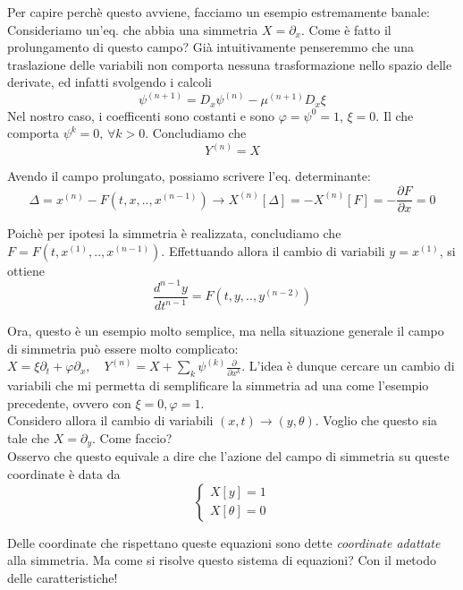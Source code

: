 \documentclass{report}
\begin{document}
Per capire perchè questo avviene, facciamo un esempio estremamente banale: Consideriamo un'eq. che abbia una simmetria $X = \partial_x$. Come è fatto il prolungamento di questo campo? Già intuitivamente penseremmo che una traslazione delle variabili non comporta nessuna trasformazione nello spazio delle derivate, ed infatti svolgendo i calcoli
\begin{equation}
    \psi^{(n+1)} = D_x\psi^{(n)} - \mu^{(n+1)}D_x\xi
\end{equation}
Nel nostro caso, i coefficenti sono costanti e sono $\varphi = \psi^{0} = 1$, $\xi =0$. Il che comporta $\psi^{k} = 0 , \, \forall k>0$. Concludiamo che 
\begin{equation}
    Y^{(n)} = X
\end{equation}

Avendo il campo prolungato, possiamo scrivere l'eq. determinante: 
\begin{equation}
    \Delta = x^{(n)} -F(t, x, .., x^{(n-1)}) \rightarrow X^{(n)}[\Delta] = -X^{(n)}[F] = -\frac{\partial F}{\partial x} = 0  
\end{equation}

Poichè per ipotesi la simmetria è realizzata, concludiamo che $F = F(t, x^{(1) }, .., x^{(n-1)})$. Effettuando allora il cambio di variabili $y = x^{(1)}$, si ottiene 
\begin{equation}
    \frac{d^{n-1} y}{dt^{n-1}} = F(t, y, .., y^{(n-2)})
\end{equation}

Ora, questo è un esempio molto semplice, ma nella situazione generale il campo di simmetria può essere molto complicato: $X = \xi\partial_t + \varphi\partial_x, \quad Y^{(n)} = X + \sum_k\psi^{(k)}\frac{\partial}{\partial x^{k}}$. L'idea è dunque cercare un cambio di variabili che mi permetta di semplificare la simmetria ad una come l'esempio precedente, ovvero con $\xi = 0, \varphi = 1$. \\

Considero allora il cambio di variabili $(x, t) \rightarrow (y, \theta)$. Voglio che questo sia tale che $X = \partial_y$. Come faccio? \\

Osservo che questo equivale a dire che l'azione del campo di simmetria su queste coordinate è data da
\[\begin{cases}
    X[y]  =1 \\ X[\theta] = 0
\end{cases}\]

Delle coordinate che rispettano queste equazioni sono dette \emph{coordinate adattate} alla simmetria. Ma come si risolve questo sistema di equazioni? Con il metodo delle caratteristiche! \\
\end{document}
